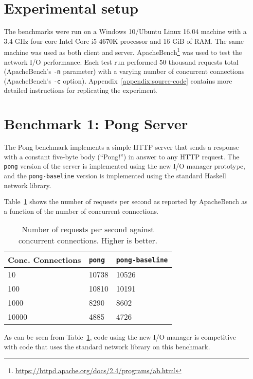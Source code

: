\documentclass[a4paper,11pt,oneside]{report}
\begin{document}
\section{Experimental setup}

The benchmarks were run on a Windows 10/Ubuntu Linux 16.04 machine with a 3.4
GHz four-core Intel Core i5 4670K processor and 16 GiB of RAM. The same machine
was used as both client and
server. ApacheBench\footnote{\url{https://httpd.apache.org/docs/2.4/programs/ab.html}}
was used to test the network I/O performance. Each test run performed 50
thousand requests total (ApacheBench's \texttt{-n} parameter) with a varying
number of concurrent connections (ApacheBench's \texttt{-c}
option). Appendix~\ref{appendix:source-code} contains more detailed instructions
for replicating the experiment.

\section{Benchmark 1: Pong Server}

The Pong benchmark implements a simple HTTP server that sends a response
with a constant five-byte body (``Pong!'') in answer to any HTTP request. The
\texttt{pong} version of the server is implemented using the new I/O manager
prototype, and the \texttt{pong-baseline} version is implemented using the
standard Haskell network library.

Table~\ref{tbl:pong} shows the number of requests per second as reported by
ApacheBench as a function of the number of concurrent connections.

\begin{table}[h!]
\centering
\begin{tabular}{ | l | l | l | }
  \hline
  Conc. Connections & \texttt{pong} & \texttt{pong-baseline} \\
  \hline
  10 & 10738 & 10526 \\
  \hline
  100 & 10810 & 10191 \\
  \hline
  1000 & 8290 & 8602 \\
  \hline
  10000 & 4885 & 4726 \\
  \hline
\end{tabular}
\caption{Number of requests per second against concurrent connections. Higher is better.}
\label{tbl:pong}
\end{table}

As can be seen from Table~\ref{tbl:pong}, code using the new I/O manager is
competitive with code that uses the standard network library on this benchmark.
\end{document}
